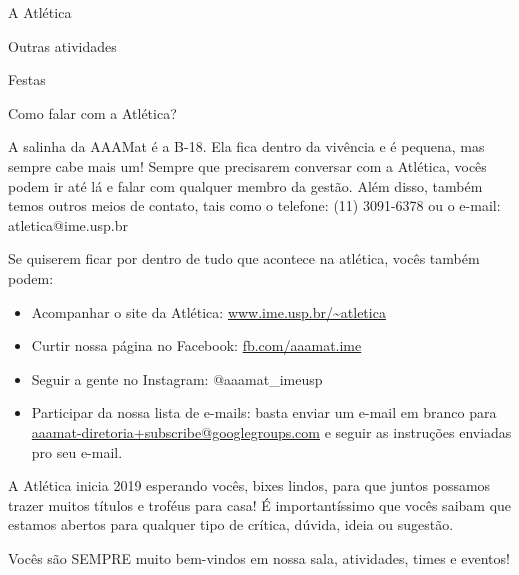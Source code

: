 \begin{secao}{A Atlética}
\begin{subsecao}{Outras atividades}
\begin{subsubsecao}{Festas}
\end{subsubsecao}
\begin{subsubsecao}{Como falar com a Atlética?}

A salinha da AAAMat é a B-18. Ela fica dentro da vivência e é pequena, mas
sempre cabe mais um! Sempre que precisarem conversar com a Atlética, vocês
podem ir até lá e falar com qualquer membro da gestão. Além disso, também temos
outros meios de contato, tais como o telefone: (11) 3091-6378 ou o e-mail:
atletica@ime.usp.br

Se quiserem ficar por dentro de tudo que acontece na atlética, vocês também
podem:

\begin{itemize}
  \item Acompanhar o site da Atlética: \url{www.ime.usp.br/~atletica}
  \item Curtir nossa página no Facebook: \url{fb.com/aaamat.ime}
  \item Seguir a gente no Instagram: @aaamat\_imeusp
  \item Participar da nossa lista de e-mails: basta enviar um e-mail em branco
        para \url{aaamat-diretoria+subscribe@googlegroups.com} e seguir as
        instruções enviadas pro seu e-mail.
\end{itemize}

A Atlética inicia 2019 esperando vocês, bixes lindos, para que juntos possamos
trazer muitos títulos e troféus para casa! É importantíssimo que vocês saibam
que estamos abertos para qualquer tipo de crítica, dúvida, ideia ou sugestão.

Vocês são SEMPRE muito bem-vindos em nossa sala, atividades, times e eventos!
\end{subsubsecao}
\end{subsecao}
\end{secao}
